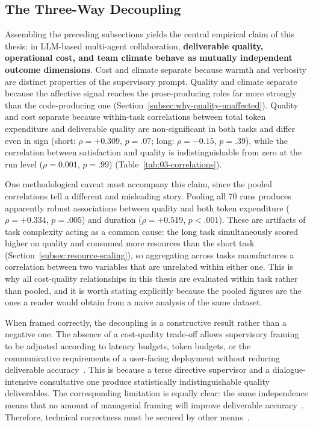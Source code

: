\subsection{The Three-Way Decoupling}
\label{subsec:three-way-decoupling}

Assembling the preceding subsections yields the central empirical claim of this thesis: in \ac{LLM}-based multi-agent collaboration, \textbf{deliverable quality, operational cost, and team climate behave as mutually independent outcome dimensions}.
Cost and climate separate because warmth and verbosity are distinct properties of the supervisory prompt.
Quality and climate separate because the affective signal reaches the prose-producing roles far more strongly than the code-producing one (Section~\ref{subsec:why-quality-unaffected}).
Quality and cost separate because within-task correlations between total token expenditure and deliverable quality are non-significant in both tasks and differ even in sign (short: $\rho = +0.309$, $p = .07$; long: $\rho = -0.15$, $p = .39$), while the correlation between satisfaction and quality is indistinguishable from zero at the run level ($\rho = 0.001$, $p = .99$) (Table~\ref{tab:03-correlations}).

One methodological caveat must accompany this claim, since the pooled correlations tell a different and misleading story.
Pooling all 70 runs produces apparently robust associations between quality and both token expenditure ($\rho = +0.334$, $p = .005$) and duration ($\rho = +0.519$, $p < .001$).
These are artifacts of task complexity acting as a common cause: the long task simultaneously scored higher on quality and consumed more resources than the short task (Section~\ref{subsec:resource-scaling}), so aggregating across tasks manufactures a correlation between two variables that are unrelated within either one.
This is why all cost-quality relationships in this thesis are evaluated within task rather than pooled, and it is worth stating explicitly because the pooled figures are the ones a reader would obtain from a naive analysis of the same dataset.

When framed correctly, the decoupling is a constructive result rather than a negative one.
The absence of a cost-quality trade-off allows supervisory framing to be adjusted according to latency budgets, token budgets, or the communicative requirements of a user-facing deployment without reducing deliverable accuracy~\cite{zhang2024cutcrapeconomicalcommunication, wu2023autogenenablingnextgenllm}.
This is because a terse directive supervisor and a dialogue-intensive consultative one produce statistically indistinguishable quality deliverables.
The corresponding limitation is equally clear: the same independence means that no amount of managerial framing will improve deliverable accuracy~\cite{kwak2026leadershipcoordinationcontrolbehavioral}. 
Therefore, technical correctness must be secured by other means~\cite{wei2023chainofthoughtpromptingelicitsreasoning, wang2023selfconsistencyimproveschainthought, chen2025multiagentasjudgealigningllmagentbasedautomated}.

